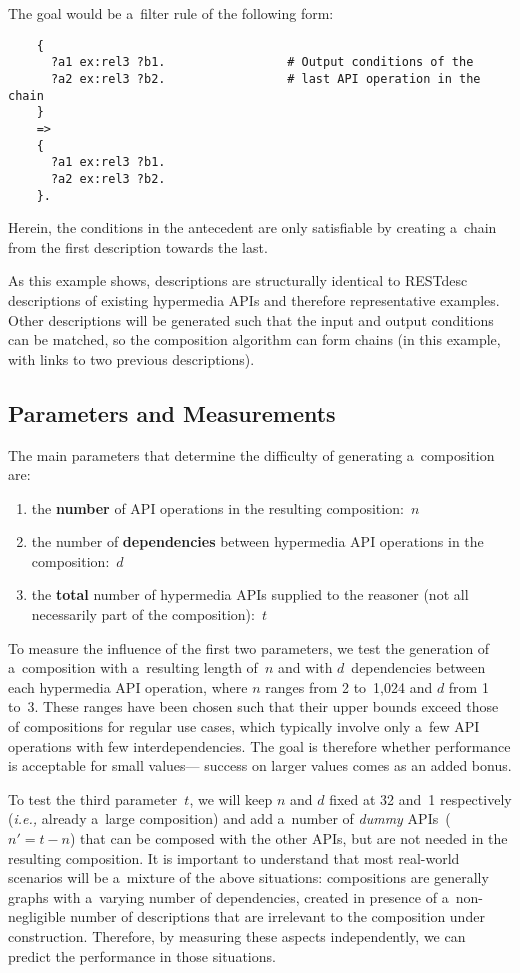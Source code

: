 The goal would be a~filter rule of the following form:
\begin{Verbatim}
    {
      ?a1 ex:rel3 ?b1.                 # Output conditions of the
      ?a2 ex:rel3 ?b2.                 # last API operation in the chain
    }
    =>
    {
      ?a1 ex:rel3 ?b1.
      ?a2 ex:rel3 ?b2.
    }.
\end{Verbatim}
Herein, the conditions in the antecedent
are only satisfiable by creating a~chain
from the first description towards the last.

As this example shows,
descriptions are structurally identical to RESTdesc descriptions of existing hypermedia APIs
and therefore representative examples.
Other descriptions will be generated
such that the input and output conditions can be matched,
so the composition algorithm can form chains
(in this example, with links to two previous descriptions).

\subsection{Parameters and Measurements}
The main parameters that determine the difficulty of generating a~composition are:
\begin{enumerate}
\item the \textbf{number} of API operations in the resulting composition:~$n$
\item the number of \textbf{dependencies} between hypermedia API operations in the composition:~$d$
\item the \textbf{total} number of hypermedia APIs supplied to the reasoner
      (not all necessarily part of the composition):~$t$
\end{enumerate}

To measure the influence of the first two parameters,
we test the generation of a~composition with a~resulting length of~$n$
and with $d$~dependencies between each hypermedia API operation,
where $n$ ranges from 2 to~1,024 and $d$ from 1 to~3.
These ranges have been chosen such that their upper bounds exceed
those of compositions for regular use cases,
which typically involve only a~few API operations
with few interdependencies.
The goal is therefore whether performance is acceptable for small values---%
success on larger values comes as an added bonus.


To test the third parameter~$t$,
we will keep $n$ and $d$ fixed at 32 and~1 respectively
(\textit{i.e.,} already a~large composition)
and add a~number of \emph{dummy} APIs~($n'=t-n$) that can be composed with the other APIs,
but are not needed in the resulting composition.
It is important to understand that most real-world scenarios will be a~mixture
of the above situations:
compositions are generally graphs with a~varying number of dependencies,
created in presence of a~non-negligible number of descriptions that are irrelevant to the composition under construction.
Therefore, by measuring these aspects independently,
we can predict the performance in those situations.

